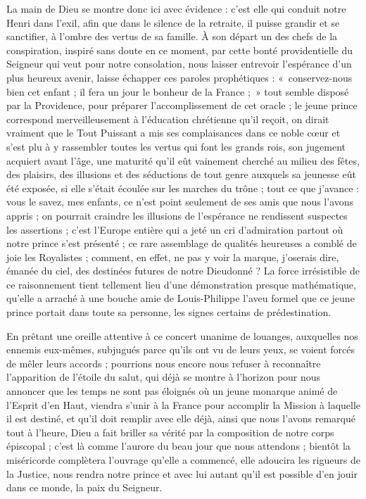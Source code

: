 \documentclass[11pt,a4paper]{report}
\begin{document}
La main de Dieu se montre donc ici avec évidence : c'est elle qui conduit notre Henri dans l'exil, afin que dans le silence de la retraite, il puisse grandir et se sanctifier, à l'ombre des vertus de sa famille. À son départ un des chefs de la conspiration, inspiré sans doute en ce moment, par cette bonté providentielle du Seigneur qui veut pour notre consolation, nous laisser entrevoir l'espérance d'un plus heureux avenir, laisse échapper ces paroles prophétiques : «~conservez-nous bien cet enfant ; il fera un jour le bonheur de la France ;~» tout semble disposé par la Providence, pour préparer l'accomplissement de cet oracle ; le jeune prince correspond merveilleusement à l'éducation chrétienne qu'il reçoit, on dirait vraiment que le Tout Puissant a mis ses complaisances dans ce noble cœur et s'est plu à y rassembler toutes les vertus qui font les grands rois, son jugement acquiert avant l'âge, une maturité qu'il eût vainement cherché au milieu des fêtes, des plaisirs, des illusions et des séductions de tout genre auxquels sa jeunesse eût été exposée, si elle s'était écoulée sur les marches du trône ; tout ce que j'avance : vous le savez, mes enfants, ce n'est point seulement de ses amis que nous l'avons appris ; on pourrait craindre les illusions de l'espérance ne rendissent suspectes les assertions ; c'est l'Europe entière qui a jeté un cri d'admiration partout où notre prince s'est présenté ; ce rare assemblage de qualités heureuses a comblé de joie les Royalistes ; comment, en effet, ne pas y voir la marque, j'oserais dire, émanée du ciel, des destinées futures de notre Dieudonné ? La force irrésistible de ce raisonnement tient tellement lieu d'une démonstration presque mathématique, qu'elle a arraché à une bouche amie de Louis-Philippe l'aveu formel que ce jeune prince portait dans toute sa personne, les signes certains de prédestination.

En prêtant une oreille attentive à ce concert unanime de louanges, auxquelles nos ennemis eux-mêmes, subjugués parce qu'ils ont vu de leurs yeux, se voient forcés de mêler leurs accords ; pourrions nous encore nous refuser à reconnaître l'apparition de l'étoile du salut, qui déjà se montre à l'horizon pour nous annoncer que les temps ne sont pas éloignés où un jeune monarque animé de l'Esprit d'en Haut, viendra s'unir à la France pour accomplir la Mission à laquelle il est destiné, et qu'il doit remplir avec elle déjà, ainsi que nous l'avons remarqué tout à l'heure, Dieu a fait briller sa vérité par la composition de notre corps épiscopal ; c'est là comme l'aurore du beau jour que nous attendons ; bientôt la miséricorde complètera l'ouvrage qu'elle a commencé, elle adoucira les rigueurs de la Justice, nous rendra notre prince et avec lui autant qu'il est possible d'en jouir dans ce monde, la paix du Seigneur.
\end{document}
